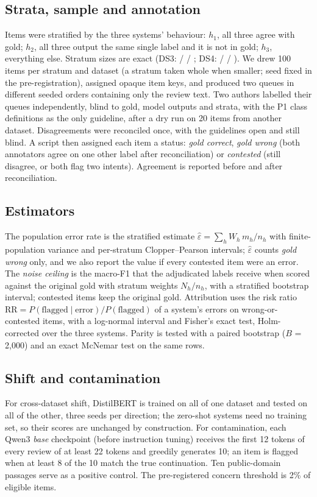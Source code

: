 \documentclass[sigconf,anonymous,review]{acmart}
\newcommand{\fone}{macro-F1\xspace}
\newcommand{\eps}{\varepsilon}
\begin{document}
\subsection{Strata, sample and annotation}
Items were stratified by the three systems' behaviour: $h_1$, all three agree with gold; $h_2$, all three output the same single label and it is not in gold; $h_3$, everything else. Stratum sizes are exact (DS3: \strataHoneDSthree{} / \strataHtwoDSthree{} / \strataHthreeDSthree; DS4: \strataHoneDSfour{} / \strataHtwoDSfour{} / \strataHthreeDSfour). We drew 100 items per stratum and dataset (a stratum taken whole when smaller; seed fixed in the pre-registration), assigned opaque item keys, and produced two queues in different seeded orders containing only the review text. Two authors labelled their queues independently, blind to gold, model outputs and strata, with the P1 class definitions as the only guideline, after a dry run on 20 items from another dataset. Disagreements were reconciled once, with the guidelines open and still blind. A script then assigned each item a status: \emph{gold correct}, \emph{gold wrong} (both annotators agree on one other label after reconciliation) or \emph{contested} (still disagree, or both flag two intents). Agreement is reported before and after reconciliation.

\subsection{Estimators}
The population error rate is the stratified estimate $\hat\eps = \sum_h W_h\, m_h/n_h$ with finite-population variance and per-stratum Clopper--Pearson intervals; $\hat\eps$ counts \emph{gold wrong} only, and we also report the value if every contested item were an error. The \emph{noise ceiling} is the \fone that the adjudicated labels receive when scored against the original gold with stratum weights $N_h/n_h$, with a stratified bootstrap interval; contested items keep the original gold. Attribution uses the risk ratio $\mathrm{RR} = P(\text{flagged}\mid\text{error})/P(\text{flagged})$ of a system's errors on wrong-or-contested items, with a log-normal interval and Fisher's exact test, Holm-corrected over the three systems. Parity is tested with a paired bootstrap ($B$ = 2{,}000) and an exact McNemar test on the same rows.

\subsection{Shift and contamination}
For cross-dataset shift, DistilBERT is trained on all of one dataset and tested on all of the other, three seeds per direction; the zero-shot systems need no training set, so their scores are unchanged by construction. For contamination, each Qwen3 \emph{base} checkpoint (before instruction tuning) receives the first 12 tokens of every review of at least 22 tokens and greedily generates 10; an item is flagged when at least 8 of the 10 match the true continuation. Ten public-domain passages serve as a positive control. The pre-registered concern threshold is 2\% of eligible items.
\end{document}
